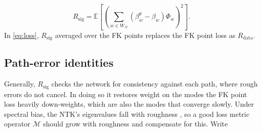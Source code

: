 \documentclass[english]{article}
\begin{document}
\begin{equation}\label{eq:rsig}
    R_\mathrm{sig} = \mathbb{E}\left[\left(\sum_{w\in W_N}\left(\beta^\theta _w - \beta_w\right)\Phi_w\right)^2 \right].
\end{equation}
In \eqref{eq:loss}, $R_\mathrm{sig}$ averaged over the FK points replaces the FK point loss as $R_\mathrm{data}$.

\subsection{Path-error identities}\label{sec:identities}
Generally, $R_\mathrm{sig}$ checks the network for consistency against each path, where rough errors do not cancel. In doing so it restores weight on the modes the FK point loss heavily down-weights, which are also the modes that converge slowly. Under spectral bias, the NTK's eigenvalues fall with roughness \cite{rahaman2019spectral,wang2022ntk}, so a good loss metric operator $\mathcal M$ should grow with roughness and compensate for this. Write
\end{document}
